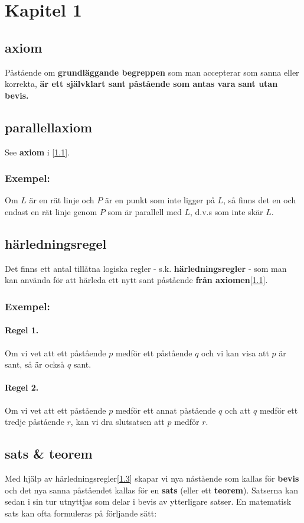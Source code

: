 \section{Kapitel 1} 
\subsection{\textbf{axiom}}\label{axiom} 
    \textbf{\cite{axiom}} Påstående om \textbf{grundläggande begreppen} som man accepterar som sanna eller korrekta, \textbf{är ett självklart sant påstående som antas vara sant utan bevis.}
\subsection{\textbf{parallellaxiom}}\label{parallellaxiom} 
    See \textbf{axiom} i [\ref{axiom}].
    \subsubsection{Exempel:}
    Om $L$ är en rät linje och $P$ är en punkt som inte ligger på $L$, så finns det en och endast en rät linje genom $P$ som är parallell med $L$, d.v.s som inte skär $L$.
\subsection{\textbf{härledningsregel}}\label{härledningsregel}
    \textbf{\cite{härledningsregel}} Det finns ett antal tillåtna logiska regler - s.k. \textbf{härledningsregler} - som man kan använda för att härleda ett nytt sant påstående \textbf{från axiomen}[\ref{axiom}].
    \subsubsection{Exempel:}
        \paragraph{Regel 1.}
            Om vi vet att ett påstående $p$ medför ett påstående $q$ och vi kan visa att $p$ är sant, så är också $q$ sant.
        \paragraph{Regel 2.}
            Om vi vet att ett påstående $p$ medför ett annat påstående $q$ och att $q$ medför ett tredje påstående $r$, kan vi dra slutsatsen att $p$ medför $r$.
\subsection{\textbf{sats \& teorem}}\label{sats}
    \textbf{\cite{sats}}Med hjälp av härledningsregler[\ref{härledningsregel}] skapar vi nya nåstående som kallas för \textbf{bevis} och det nya sanna påståendet kallas för en \textbf{sats} (eller ett \textbf{teorem}). Satserna kan sedan i sin tur utnyttjas som delar i bevis av ytterligare satser. En matematisk sats kan ofta formuleras på förljande sätt:
